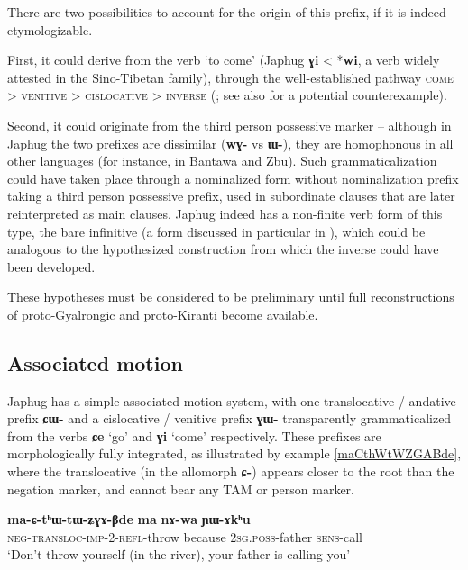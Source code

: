 \documentclass[oldfontcommands,oneside,a4paper,11pt]{article}
\newcommand{\ipa}[1]{\mbox{\phon\textbf{#1}}} %
\begin{document}
There are two possibilities to account for the origin of this prefix, if it is indeed etymologizable. 

First, it could derive from the verb `to come' (Japhug \ipa{ɣi} < *\ipa{wi}, a verb widely attested in the Sino-Tibetan family), through the well-established pathway \textsc{come} > \textsc{venitive} > \textsc{cislocative} > \textsc{inverse} (\citealt{jacques14inverse}; see also \citealt{konnerth15cisloc} for a potential counterexample).

Second, it could originate from the third person possessive marker -- although in Japhug the two prefixes are dissimilar (\ipa{wɣ-} vs \ipa{ɯ-}), they are homophonous in all other languages (for instance, in Bantawa and Zbu). Such grammaticalization could have taken place through a nominalized form without nominalization prefix taking a third person possessive prefix, used in subordinate clauses that are later reinterpreted as main clauses.  Japhug indeed has a non-finite verb form of this type, the bare infinitive (a form discussed in particular in \citealt{jacques14antipassive}), which could be analogous to the hypothesized construction from which the inverse could have been developed.

These hypotheses must be considered to be preliminary until full reconstructions of proto-Gyalrongic and proto-Kiranti become available.

\subsection{Associated motion}
Japhug has a simple associated motion system, with one translocative / andative prefix \ipa{ɕɯ-} and a cislocative / venitive prefix \ipa{ɣɯ-} transparently grammaticalized from the verbs \ipa{ɕe} `go' and \ipa{ɣi} `come' respectively. These prefixes are morphologically fully integrated, as illustrated by example \ref{maCthWtWZGABde}, where the translocative (in the allomorph \ipa{ɕ-}) appears closer to the root than the negation marker, and cannot bear any TAM or person marker.

\begin{exe}
\ex \label{maCthWtWZGABde}
\gll \ipa{ma-ɕ-tʰɯ-tɯ-ʑɣɤ-βde} 	\ipa{ma} 	\ipa{nɤ-wa} 	\ipa{ɲɯ-ɤkʰu}   \\
\textsc{neg-transloc-imp-2-refl}-throw because \textsc{2sg.poss}-father \textsc{sens}-call \\
\glt `Don't throw yourself (in the river), your father is calling you' 
\end{exe}
\end{document}
